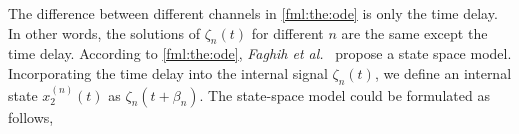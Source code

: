 \documentclass[10pt,conference]{ieeeconf}
\begin{document}
The difference between different channels in \eqref{fml:the:ode} is only the time delay. In other words, the solutions of $\zeta_n(t)$ for different $n$ are the same except the time delay. According to \eqref{fml:the:ode}, \textit{Faghih et al.}~\cite{faghih2015characterization} propose a state space model. Incorporating the time delay into the internal signal $\zeta_n(t)$, we define an internal state $x^{(n)}_2 (t)$ as $\zeta_n(t + \beta_n)$. The state-space model could be formulated as follows,
%
%
\end{document}

